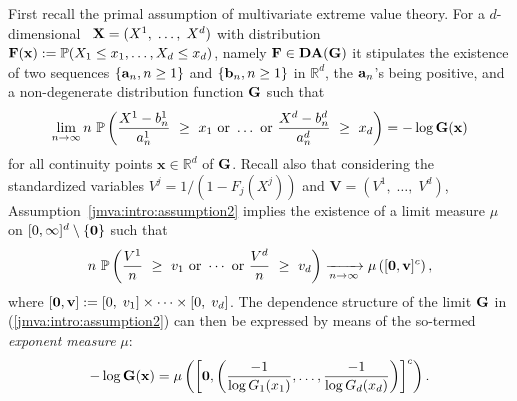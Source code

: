 First recall the primal assumption of multivariate extreme value theory.
For a $d$-dimensional \rv~$\mathbf X = (X^1,\; \ldots, \; X^d)$ with distribution $\mathbf F(\mathbf x):=\mathbb{P}(X_1 \le x_1, \ldots, X_d \le x_d)$, namely $\mathbf F \in \textbf{DA} (\mathbf G)$ it stipulates the existence of two sequences $\{\mathbf a_n, n \ge 1\}$ and $\{\mathbf b_n, n \ge 1\}$ in $\mathbb{R}^d$, the $\mathbf a_n$'s being positive, and a non-degenerate distribution function $\mathbf G$ such that
\begin{align}
\label{jmva:intro:assumption2}
\lim_{n \to \infty} n ~\mathbb{P}\left( \frac{X^1 - b_n^1}{a_n^1} ~\ge~ x_1 \text{~or~} \ldots \text{~or~} \frac{X^d - b_n^d}{a_n^d} ~\ge~ x_d \right) = -\log \mathbf G(\mathbf{x})
\end{align}
for all continuity points $\mathbf{x} \in \mathbb{R}^d$ of $\mathbf G$. 
Recall also that considering the standardized variables 
 $V^j =1/(1-F_j(X^j))$ and $\mathbf{V}=(V^1,\; \ldots,\; V^d)$, Assumption~\eqref{jmva:intro:assumption2} implies the  existence of a limit measure $\mu$  on $ [0,\infty]^d\setminus\{\mathbf 0\}$ such that %
\begin{align}
\label{jmva:intro:regvar}
 n~ \mathbb{P}\left( \frac{V^1 }{n} ~\ge~ v_1 \text{~or~} \cdots
   \text{~or~} \frac{V^d }{n} ~\ge~ v_d \right) \xrightarrow[n\to\infty]{}\mu \left([\mathbf 0,\mathbf v]^c\right),
\end{align}
where $[\mathbf 0,\mathbf{v}]:=[0,\; v_1]\times \cdots \times
[0,\; v_d]$. The dependence structure of the limit $\mathbf G$ in (\ref{jmva:intro:assumption2}) can then be expressed by means of the so-termed \textit{exponent measure} $\mu$: 
\begin{align}
- \log \mathbf G(\mathbf{x})= \mu\left( \left[ \mathbf 0, \left(\frac{-1}{\log G_1(x_1)}, \dots ,\frac{-1}{\log G_d(x_d)}\right)\right]^c\right). \nonumber
\end{align}

